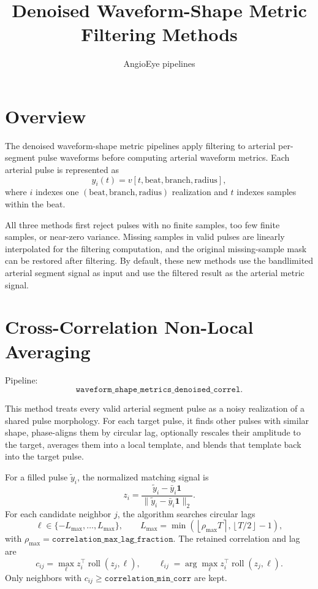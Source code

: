 \documentclass[11pt]{article}
\title{Denoised Waveform-Shape Metric Filtering Methods}
\author{AngioEye pipelines}
\date{}
\begin{document}
\maketitle

\section{Overview}

The denoised waveform-shape metric pipelines apply filtering to arterial
per-segment pulse waveforms before computing arterial waveform metrics.  Each
arterial pulse is represented as
\[
    y_i(t)=v[t,\mathrm{beat},\mathrm{branch},\mathrm{radius}],
\]
where \(i\) indexes one \((\mathrm{beat},\mathrm{branch},\mathrm{radius})\)
realization and \(t\) indexes samples within the beat.

All three methods first reject pulses with no finite samples, too few finite
samples, or near-zero variance.  Missing samples in valid pulses are linearly
interpolated for the filtering computation, and the original missing-sample
mask can be restored after filtering.  By default, these new methods use the
bandlimited arterial segment signal as input and use the filtered result as
the arterial metric signal.

\section{Cross-Correlation Non-Local Averaging}

Pipeline:
\[
    \texttt{waveform\_shape\_metrics\_denoised\_correl}.
\]

This method treats every valid arterial segment pulse as a noisy realization
of a shared pulse morphology.  For each target pulse, it finds other pulses
with similar shape, phase-aligns them by circular lag, optionally rescales
their amplitude to the target, averages them into a local template, and blends
that template back into the target pulse.

For a filled pulse \(\tilde y_i\), the normalized matching signal is
\[
    z_i =
    \frac{\tilde y_i-\bar y_i\mathbf{1}}
         {\|\tilde y_i-\bar y_i\mathbf{1}\|_2}.
\]
For each candidate neighbor \(j\), the algorithm searches circular lags
\[
    \ell \in \{-L_{\max},\ldots,L_{\max}\},
    \qquad
    L_{\max} =
    \min\left(\left\lfloor \rho_{\max}T \right\rceil,
    \left\lfloor T/2 \right\rfloor - 1\right),
\]
with \(\rho_{\max}=\texttt{correlation\_max\_lag\_fraction}\).  The retained
correlation and lag are
\[
    c_{ij}=\max_{\ell} z_i^\top \operatorname{roll}(z_j,\ell),
    \qquad
    \ell_{ij}=\arg\max_{\ell} z_i^\top \operatorname{roll}(z_j,\ell).
\]
Only neighbors with \(c_{ij}\geq\texttt{correlation\_min\_corr}\) are kept.
\end{document}

